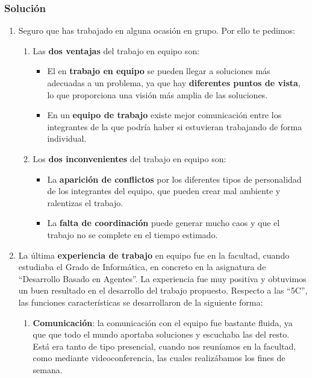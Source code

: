 \subsubsection{Solución}
\begin{enumerate}
    \item Seguro que has trabajado en alguna ocasión en grupo. Por ello te pedimos:
    \begin{enumerate}
        \item Las \textbf{dos ventajas} del trabajo en equipo son:
        \begin{itemize}
            \item El en \textbf{trabajo en equipo} se pueden llegar a soluciones más adecuadas a un problema, ya que hay \textbf{diferentes puntos de vista}, lo que proporciona una visión más amplia de las soluciones.
            \item En un \textbf{equipo de trabajo} existe mejor comunicación entre los integrantes de la que podría haber si estuvieran trabajando de forma individual.
        \end{itemize}

        \item Los \textbf{dos inconvenientes} del trabajo en equipo son:
        \begin{itemize}
            \item La \textbf{aparición de conflictos} por los diferentes tipos de personalidad de los integrantes del equipo, que pueden crear mal ambiente y ralentizas el trabajo.
            \item La \textbf{falta de coordinación} puede generar mucho caos y que el trabajo no se complete en el tiempo estimado.
        \end{itemize}
    \end{enumerate}

    \item La última \textbf{experiencia de trabajo} en equipo fue en la facultad, cuando estudiaba el Grado de Informática, en concreto en la asignatura de ``Desarrollo Basado en Agentes''. La experiencia fue muy positiva y obtuvimos un buen resultado en el desarrollo del trabajo propuesto. Respecto a las ``5C'', las funciones características se desarrollaron de la siguiente forma:

    \begin{enumerate}
        \item \textbf{Comunicación}: la comunicación con el equipo fue bastante fluida, ya que que todo el mundo aportaba soluciones y escuchaba las del resto. Está era tanto de tipo presencial, cuando nos reuníamos en la facultad, como mediante videoconferencia, las cuales realizábamos los fines de semana.


\end{enumerate}
\end{enumerate}
